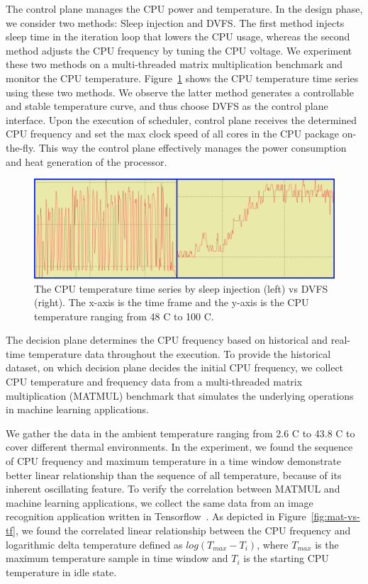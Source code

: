 The control plane
manages the CPU power and temperature. In the design phase, we consider two methods: Sleep injection and DVFS. The first method injects sleep time in the iteration loop that lowers the CPU usage, whereas the second method adjusts the CPU frequency by tuning the CPU voltage. We experiment these two methods on a multi-threaded matrix multiplication benchmark and monitor the CPU temperature. Figure~\ref{fig:sleep} shows the CPU temperature time series using these two methods. We observe the latter method generates a controllable and stable temperature curve, and thus choose DVFS as the control plane interface. Upon the execution of scheduler, control plane receives the determined CPU frequency and set the max clock speed of all cores in the CPU package on-the-fly. This way the control plane effectively manages the power consumption and heat generation of the processor.

\begin{figure}[ht]
\includegraphics[width=\textwidth]{figures/Sleep-vs-dvfs.png}
\caption{The CPU temperature time series by sleep injection (left) vs DVFS (right). The x-axis is the time frame and the y-axis is the CPU temperature ranging from 48 \degree C to 100 \degree C. } \label{fig:sleep}
\end{figure}


The decision plane
 determines the CPU frequency based on historical and real-time temperature data throughout the execution. To provide the historical dataset, on which decision plane decides the initial CPU frequency, we collect CPU temperature and frequency data from a multi-threaded matrix multiplication (MATMUL) benchmark that simulates the underlying operations in machine learning applications. 

We gather the data in the ambient temperature ranging from 2.6 \degree C to 43.8 \degree C to cover different thermal environments. In the experiment, we found the sequence of CPU frequency and maximum temperature in a time window demonstrate better linear relationship than the sequence of all temperature, because of its inherent oscillating feature. To verify the correlation between MATMUL and machine learning applications, we collect the same data from an image recognition application written in Tensorflow~\cite{ref:tensorflow}. As depicted in Figure~\ref{fig:mat-vs-tf}, we found the correlated linear relationship between the CPU frequency and logarithmic delta temperature defined as $log(T_{max} - T_i)$, where $T_{max}$ is the maximum temperature sample in time window and $T_i$ is the starting CPU temperature in idle state. 
 
